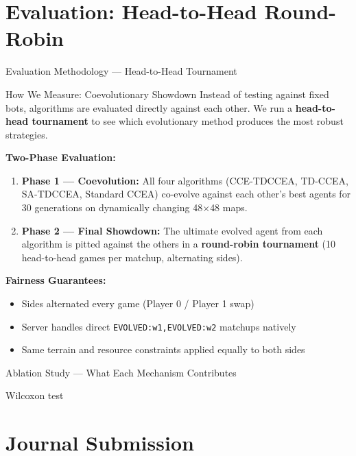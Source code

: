 \documentclass[aspectratio=169, 11pt]{beamer}
\begin{document}
\section{Evaluation: Head-to-Head Round-Robin}
\begin{frame}{Evaluation Methodology --- Head-to-Head Tournament}
\small
\begin{block}{How We Measure: Coevolutionary Showdown}
Instead of testing against fixed bots, algorithms are evaluated directly against each other. We run a \textbf{head-to-head tournament} to see which evolutionary method produces the most robust strategies.
\end{block}
\vspace{0.15cm}
\textbf{Two-Phase Evaluation:}
\begin{enumerate}
    \item \textbf{Phase 1 --- Coevolution:} All four algorithms (CCE-TDCCEA, TD-CCEA, SA-TDCCEA, Standard CCEA) co-evolve against each other's best agents for 30 generations on dynamically changing 48$\times$48 maps.
    \item \textbf{Phase 2 --- Final Showdown:} The ultimate evolved agent from each algorithm is pitted against the others in a \textbf{round-robin tournament} (10 head-to-head games per matchup, alternating sides).
\end{enumerate}
\vspace{0.15cm}
\textbf{Fairness Guarantees:}
\begin{itemize}
    \item Sides alternated every game (Player 0 / Player 1 swap)
    \item Server handles direct \texttt{EVOLVED:w1,EVOLVED:w2} matchups natively
    \item Same terrain and resource constraints applied equally to both sides
\end{itemize}
\end{frame}


\begin{frame}{Ablation Study --- What Each Mechanism Contributes}
\end{frame}

\begin{frame}{Wilcoxon test}
\end{frame}

\section{Journal Submission}
\end{document}
